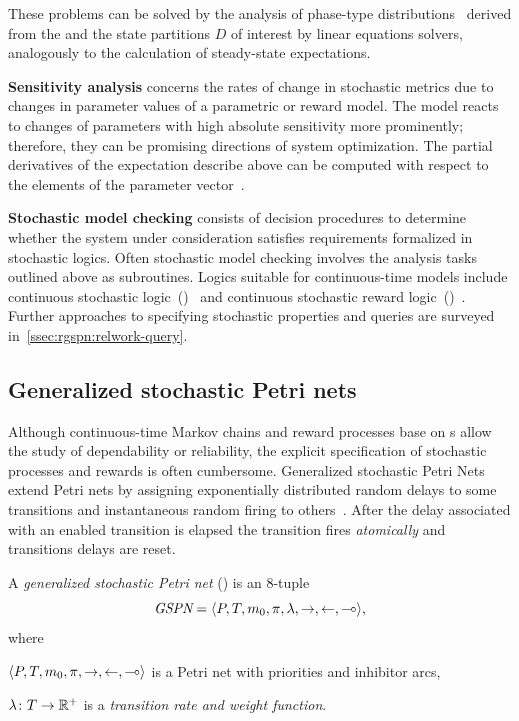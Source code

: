 These problems can be solved by the analysis of phase-type distributions~\citep{Neuts75phasetype} derived from the  and the state partitions \(D\) of interest by linear equations solvers, analogously to the calculation of steady-state expectations.

\newpara \textbf{Sensitivity analysis} concerns the rates of change in stochastic metrics due to changes in parameter values of a parametric  or reward model. The model reacts to changes of parameters with high absolute sensitivity  more prominently; therefore, they can be promising directions of system optimization. The partial derivatives of the expectation describe above can be computed with respect to the elements of the parameter vector~\citep{Blake88sensitivity,Ramesh93sensitivity}.

\newpara \textbf{Stochastic model checking} consists of decision procedures to determine whether the system under consideration satisfies requirements formalized in stochastic logics. Often stochastic model checking involves the analysis tasks outlined above as subroutines. Logics suitable for continuous-time models include continuous stochastic logic~()~\citep{Aziz96csl} and continuous stochastic reward logic~()~\citep{Kwiatkowska06csrl}. Further approaches to specifying stochastic properties and queries are surveyed in~\vref{ssec:rgspn:relwork-query}.

\subsection{Generalized stochastic Petri nets}

Although continuous-time Markov chains and reward processes base on s allow the study of dependability or reliability, the explicit specification of stochastic processes and rewards is often cumbersome. Generalized stochastic Petri Nets extend Petri nets by assigning exponentially distributed random delays to some transitions and instantaneous random firing to others~\citep{Marsan84gspn}. After the delay associated with an enabled transition is elapsed the transition fires \emph{atomically} and transitions delays are reset.

\begin{dfn}
  A \emph{generalized stochastic Petri net} () is an 8-tuple
  \begin{equation}
    \textit{GSPN} = \langle P, T, m_0, \pi, \lambda, {\rightarrow}, {\leftarrow}, {\multimap} \rangle \text,
  \end{equation}
  where
  \begin{compactitem}
  \item \(\langle P, T, m_0, \pi, {\rightarrow}, {\leftarrow}, {\multimap} \rangle\) is a Petri net with priorities and inhibitor arcs,
  \item \(\lambda\colon T \to \mathbb{R}^{+}\) is a \emph{transition rate and weight function}.
  \end{compactitem}
\end{dfn}

